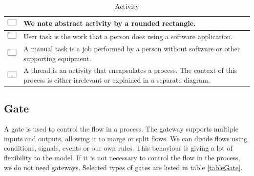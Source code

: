 \documentclass[thesis=M,english]{FITthesis}[2019/12/23]
\begin{document}
\begin{table}[ht!]
\caption{Activity} \label{tableAktivity}
\begin{center}
\begin{tabular}{ | p{1cm} | m{9cm} | } \hline
    \includegraphics[width=1cm]{assets/BPNMicons/abstractActivity.pdf}     & We note abstract activity by a rounded rectangle. 
 \\   \hline
    \includegraphics[width=1cm]{assets/BPNMicons/UserActivity.pdf} & User task is the work that a person does using a software application.  \\  \hline
    \includegraphics[width=1cm]{assets/BPNMicons/ManualnaUloha.pdf} & A manual task is a job performed by a person without software or other supporting equipment.  \\ \hline
    \includegraphics[width=1cm]{assets/BPNMicons/Podproces.pdf} & A thread is an activity that encapsulates a process. The context of this process is either irrelevant or explained in a separate diagram.  \\ \hline
\end{tabular}
\end{center}
\end{table}




\subsection{Gate}

A gate is used to control the flow in a process. The gateway supports multiple inputs and outputs, allowing it to marge or split flows. We can divide flows using conditions, signals, events or our own rules. This behaviour is giving a lot of flexibility to the model. If it is not necessary to control the flow in the process, we do not need gateways. Selected types of gates are listed in table \ref{tableGate}.
\end{document}

